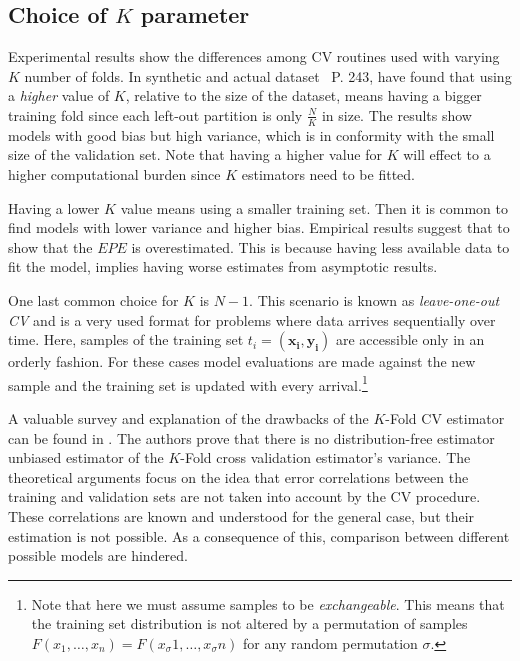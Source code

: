 \subsection{Choice of \texorpdfstring{$K$ parameter}{Lg} }

 Experimental results show the differences among CV routines used with varying $K$ number of folds. In synthetic and actual dataset~\textcite{hastie-elemstatslearn} P. 243, have found that using a \textit{higher} value of $K$, relative to the size of the dataset, means having a bigger training fold since each left-out partition is only $\frac{N}{K}$ in size. The results show models with good bias but high variance, which is in conformity with the small size of the validation set. Note that having a higher value for $K$ will effect to a higher computational burden since $K$ estimators need to be fitted.

Having a lower $K$ value means using a smaller training set. Then it is common to find models with lower variance and higher bias. Empirical results suggest that to show that the $EPE$ is overestimated. This is because having less available data to fit the model, implies having worse estimates from asymptotic results.

One last common choice for $K$ is $N-1$. This scenario is known as \textit{leave-one-out CV} and is a very used format for problems where data arrives sequentially over time. Here, samples of the training set $t_i = ( \boldsymbol{x_i} , \boldsymbol{y_i} )$ are accessible only in an orderly fashion. For these cases model evaluations are made against the new sample and the training set is updated with every arrival.\footnote{Note that here we must assume samples to be \textit{exchangeable}. This means that the training set distribution is not altered by a permutation of samples $F(x_1,\ldots,x_n ) = F(x_\sigma{1},\ldots,x_\sigma{n})$ for any random permutation $\sigma$.}



A valuable survey and explanation of the drawbacks of the $K$-Fold CV estimator can be found in \textcite{bengio-unbiasedCvEstimator}. The authors prove that there is no distribution-free estimator unbiased estimator of the $K$-Fold cross validation estimator's variance. The theoretical arguments focus on the idea that error correlations between the training and validation sets are not taken into account by the CV procedure. These correlations are known and understood for the general case, but their estimation is not possible. As a consequence of this, comparison between different possible models are hindered.

